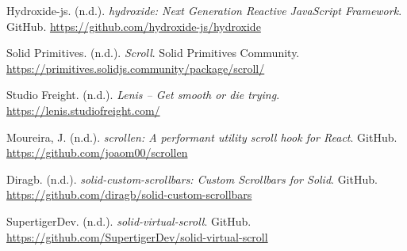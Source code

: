 \documentclass[10pt]{article}
\begin{document}
\begin{thebibliography}{99}
 Hydroxide-js. (n.d.). \textit{hydroxide: Next Generation Reactive JavaScript Framework}. GitHub. \url{https://github.com/hydroxide-js/hydroxide}

 Solid Primitives. (n.d.). \textit{Scroll}. Solid Primitives Community. \url{https://primitives.solidjs.community/package/scroll/}

 Studio Freight. (n.d.). \textit{Lenis – Get smooth or die trying}. \url{https://lenis.studiofreight.com/}

 Moureira, J. (n.d.). \textit{scrollen: A performant utility scroll hook for React}. GitHub. \url{https://github.com/joaom00/scrollen}

 Diragb. (n.d.). \textit{solid-custom-scrollbars: Custom Scrollbars for Solid}. GitHub. \url{https://github.com/diragb/solid-custom-scrollbars}

 SupertigerDev. (n.d.). \textit{solid-virtual-scroll}. GitHub. \url{https://github.com/SupertigerDev/solid-virtual-scroll}

\end{thebibliography}
\end{document}
